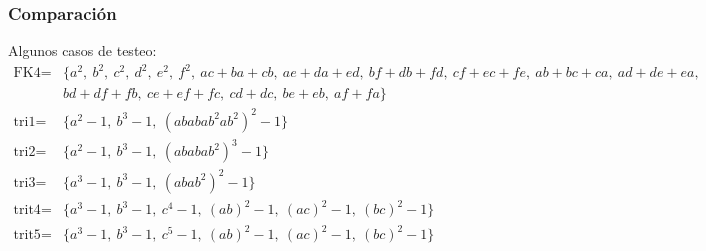 \documentclass[spanish, aspectratio=169, hidecontrols]{beamer}
\begin{document}
\begin{frame}
  \frametitle{Comparación}
  Algunos casos de testeo:
  \begin{align*}
    \text{FK4} =& \{a^2,\ b^2,\ c^2,\ d^2,\ e^2,\ f^2,\ ac + ba + cb,\ ae + da + ed,\ bf + db + fd,\ cf + ec + fe,\ ab + bc + ca,\ ad + de + ea, \\
      & bd + df + fb,\ ce + ef + fc,\ cd + dc,\ be + eb,\ af + fa\} \\
    \text{tri1} =& \{a^2 - 1,\ b^3 - 1,\ {(ababab^2ab^2)}^2 - 1\} \\
    \text{tri2} =& \{a^2 - 1,\ b^3 - 1,\ {(ababab^2)}^3 - 1\} \\
    \text{tri3} =& \{a^3 - 1,\ b^3 - 1,\ {(abab^2)}^2 - 1\} \\
    \text{trit4} =& \{a^3 - 1,\ b^3 - 1,\ c^4 - 1,\ {(ab)}^2 - 1,\ {(ac)}^2 - 1,\ {(bc)}^2 - 1\} \\
    \text{trit5} =& \{a^3 - 1,\ b^3 - 1,\ c^5 - 1,\ {(ab)}^2 - 1,\ {(ac)}^2 - 1,\ {(bc)}^2 - 1\}
  \end{align*}
\end{frame}
\end{document}
